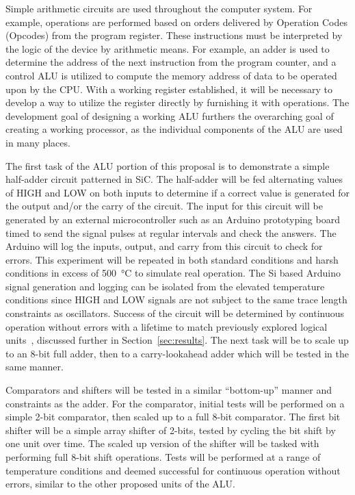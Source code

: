 \documentclass[12pt]{amsart}
\begin{document}
	Simple arithmetic circuits are used throughout the computer system.  For example, operations are performed based on orders delivered by Operation Codes (Opcodes) from the program register.  These instructions must be interpreted by the logic of the device by arithmetic means.  For example, an adder is used to determine the address of the next instruction from the program counter, and a control ALU is utilized to compute the memory address of data to be operated upon by the CPU.  With a working register established, it will be necessary to develop a way to utilize the register directly by furnishing it with operations.  The development goal of designing a working ALU furthers the overarching goal of creating a working processor, as the individual components of the ALU are used in many places.  
	
	The first task of the ALU portion of this proposal is to demonstrate a simple half-adder circuit patterned in SiC.  The half-adder will be fed alternating values of HIGH and LOW on both inputs to determine if a correct value is generated for the output and/or the carry of the circuit.  The input for this circuit will be generated by an external microcontroller such as an Arduino prototyping board timed to send the signal pulses at regular intervals and check the answers.  The Arduino will log the inputs, output, and carry from this circuit to check for errors.  This experiment will be repeated in both standard conditions and harsh conditions in excess of \SI{500}{\degreeCelsius} to simulate real operation.  The Si based Arduino signal generation and logging can be isolated from the elevated temperature conditions since HIGH and LOW signals are not subject to the same trace length constraints as oscillators.  Success of the circuit will be determined by continuous operation without errors with a lifetime to match previously explored logical units~\cite{spry2016processing}, discussed further in Section~\ref{sec:results}.  The next task will be to scale up to an 8-bit full adder, then to a carry-lookahead adder which will be tested in the same manner.  
	
	Comparators and shifters will be tested in a similar ``bottom-up'' manner and constraints as the adder.  For the comparator, initial tests will be performed on a simple 2-bit comparator, then scaled up to a full 8-bit comparator.  The first bit shifter will be a simple array shifter of 2-bits, tested by cycling the bit shift by one unit over time.  The scaled up version of the shifter will be tasked with performing full 8-bit shift operations.  Tests will be performed at a range of temperature conditions and deemed successful for continuous operation without errors, similar to the other proposed units of the ALU.
 	
\end{document}
